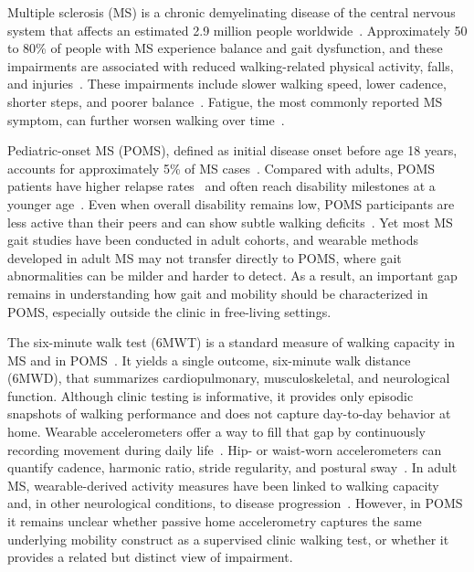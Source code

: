 \documentclass{article}
\begin{document}
Multiple sclerosis (MS) is a chronic demyelinating disease of the central nervous system that affects an estimated 2.9 million people worldwide~\cite{msif_atlas_2023_prevalence}. Approximately 50 to 80\% of people with MS experience balance and gait dysfunction, and these impairments are associated with reduced walking-related physical activity, falls, and injuries~\cite{cameron2018balance}. These impairments include slower walking speed, lower cadence, shorter steps, and poorer balance~\cite{sosnoff2012quantifying, kalron2015association, hobart2003measuring}. Fatigue, the most commonly reported MS symptom, can further worsen walking over time~\cite{freal1984symptomatic, krupp1989fatigue, confavreux2000relapses}.

Pediatric-onset MS (POMS), defined as initial disease onset before age 18 years, accounts for approximately 5\% of MS cases~\cite{siddiqui2024clinical}. Compared with adults, POMS patients have higher relapse rates~\cite{gorman2009increased} and often reach disability milestones at a younger age~\cite{renoux2007natural, mckay2019long}. Even when overall disability remains low, POMS participants are less active than their peers and can show subtle walking deficits~\cite{brenton2022sixminute}. Yet most MS gait studies have been conducted in adult cohorts, and wearable methods developed in adult MS may not transfer directly to POMS, where gait abnormalities can be milder and harder to detect. As a result, an important gap remains in understanding how gait and mobility should be characterized in POMS, especially outside the clinic in free-living settings.

The six-minute walk test (6MWT) is a standard measure of walking capacity in MS and in POMS~\cite{goldman2008evaluation, ats2002guidelines, brenton2022sixminute}. It yields a single outcome, six-minute walk distance (6MWD), that summarizes cardiopulmonary, musculoskeletal, and neurological function. Although clinic testing is informative, it provides only episodic snapshots of walking performance and does not capture day-to-day behavior at home. Wearable accelerometers offer a way to fill that gap by continuously recording movement during daily life~\cite{alexander2021wearable, karas2023systematic}. Hip- or waist-worn accelerometers can quantify cadence, harmonic ratio, stride regularity, and postural sway~\cite{sosnoff2012quantifying, igarashi2024accelerometer, moon2017monitoring, mancini2012isway, meyer2024assessing, meyer2023chest}. In adult MS, wearable-derived activity measures have been linked to walking capacity~\cite{motl2011accelerometry, silva2024comprehensive, fitzgerald2026activity, bourjeily2025accelerometry} and, in other neurological conditions, to disease progression~\cite{gupta2023athome}. However, in POMS it remains unclear whether passive home accelerometry captures the same underlying mobility construct as a supervised clinic walking test, or whether it provides a related but distinct view of impairment.
\end{document}
